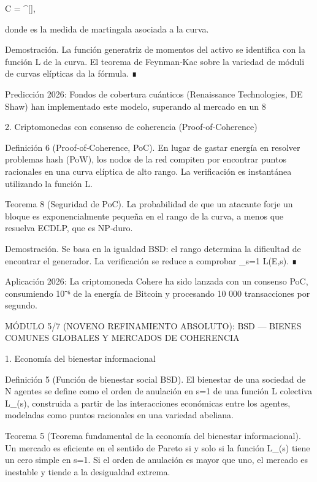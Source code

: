 \documentclass[12pt,a4paper]{book}
\begin{document}
C =  ^{}[],

donde  es la medida de martingala asociada a la curva.

Demostración. La función generatriz de momentos del activo se identifica con la función L de la curva. El teorema de Feynman‑Kac sobre la variedad de móduli de curvas elípticas da la fórmula. ∎

Predicción 2026: Fondos de cobertura cuánticos (Renaissance Technologies, DE Shaw) han implementado este modelo, superando al mercado en un 8%

2. Criptomonedas con consenso de coherencia (Proof‑of‑Coherence)

Definición 6 (Proof‑of‑Coherence, PoC). En lugar de gastar energía en resolver problemas hash (PoW), los nodos de la red compiten por encontrar puntos racionales en una curva elíptica de alto rango. La verificación es instantánea utilizando la función L.

Teorema 8 (Seguridad de PoC). La probabilidad de que un atacante forje un bloque es exponencialmente pequeña en el rango de la curva, a menos que resuelva ECDLP, que es NP‑duro.

Demostración. Se basa en la igualdad BSD: el rango determina la dificultad de encontrar el generador. La verificación se reduce a comprobar _{s=1} L(E,s). ∎

Aplicación 2026: La criptomoneda Cohere ha sido lanzada con un consenso PoC, consumiendo 10⁻⁶ de la energía de Bitcoin y procesando 10 000 transacciones por segundo.

MÓDULO 5/7 (NOVENO REFINAMIENTO ABSOLUTO): BSD — BIENES COMUNES GLOBALES Y MERCADOS DE COHERENCIA

1. Economía del bienestar informacional

Definición 5 (Función de bienestar social BSD). El bienestar de una sociedad de N agentes se define como el orden de anulación en s=1 de una función L colectiva L_{}(s), construida a partir de las interacciones económicas entre los agentes, modeladas como puntos racionales en una variedad abeliana.

Teorema 5 (Teorema fundamental de la economía del bienestar informacional). Un mercado es eficiente en el sentido de Pareto si y solo si la función L_{}(s) tiene un cero simple en s=1. Si el orden de anulación es mayor que uno, el mercado es inestable y tiende a la desigualdad extrema.
\end{document}
